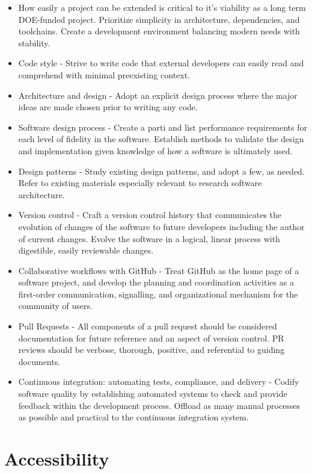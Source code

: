 \documentclass[]{nrel}
\begin{document}
\begin{itemize}
\item How easily a project can be extended is critical to it's viability as a long term
DOE-funded project.
Prioritize simplicity in architecture, dependencies, and toolchains.
Create a development environment balancing modern needs with stability.
\item Code style - Strive to write code that external developers can easily read and comprehend with minimal
preexisting context.
\item Architecture and design - Adopt an explicit design process where the major ideas are made chosen prior to writing any code.
\item Software design process - Create a parti and list performance requirements for each level of fidelity in the software.
Establish methods to validate the design and implementation given knowledge of how a software
is ultimately used.
\item Design patterns - Study existing design patterns, and adopt a few, as needed.
Refer to existing materials especially relevant to research software architecture.
\item Version control - Craft a version control history that communicates the evolution of changes of the software
to future developers including the author of current changes.
Evolve the software in a logical, linear process with digestible, easily reviewable changes.
\item Collaborative workflows with GitHub - Treat GitHub as the home page of a software project, and develop the planning and coordination
activities as a first-order communication, signalling, and organizational mechanism for the
community of users.
\item Pull Requests - All components of a pull request should be considered documentation for future reference
and an aspect of version control.
PR reviews should be verbose, thorough, positive, and referential to guiding documents.
\item Continuous integration: automating tests, compliance, and delivery - Codify software quality by establishing automated systems to check and provide feedback
within the development process.
Offload as many manual processes as possible and practical to the continuous integration system.
\end{itemize}


\chapter{Accessibility}
\label{sec:accessibility}
\end{document}
